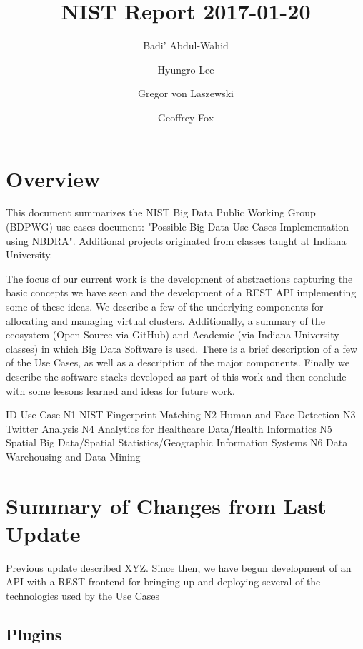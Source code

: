 \documentclass[9pt,twocolumn,twoside]{styles/osajnl}
\title{NIST Report 2017-01-20}
\author[1]{Badi' Abdul-Wahid}
\author[1]{Hyungro Lee}
\author[1]{Gregor von Laszewski}
\author[1,*]{Geoffrey Fox}
\affil[1]{School of Informatics and Computing, Bloomington, IN 47408, U.S.A.}
\affil[*]{Corresponding authors: gcf@indiana.edu}
\begin{document}
\maketitle



\section{Overview}

This document summarizes the NIST Big Data Public Working Group (BDPWG) use-cases document: "Possible Big Data Use Cases Implementation using NBDRA". Additional projects originated from classes taught at Indiana University. 


The focus of our current work is the development of abstractions capturing the basic concepts we have seen and the development of a REST API implementing some of these ideas. We describe a few of the underlying components for allocating and managing virtual clusters. Additionally, a summary of the ecosystem (Open Source via GitHub) and Academic (via Indiana University classes) in which Big Data Software is used. There is a brief description of a few of the Use Cases, as well as a description of the major components. Finally we describe the software stacks developed as part of this work and then conclude with some lessons learned and ideas for future work.


ID
	Use Case
	N1
	NIST Fingerprint Matching
	N2
	Human and Face Detection
	N3
	Twitter Analysis
	N4
	Analytics for Healthcare Data/Health Informatics
	N5
	Spatial Big Data/Spatial Statistics/Geographic Information Systems
	N6
	Data Warehousing and Data Mining
	





\section{Summary of Changes from Last Update}

Previous update described XYZ.
Since then, we have begun development of an API with a REST frontend for bringing up and deploying several of the technologies used by the Use Cases



\subsection{Plugins}
\end{document}
